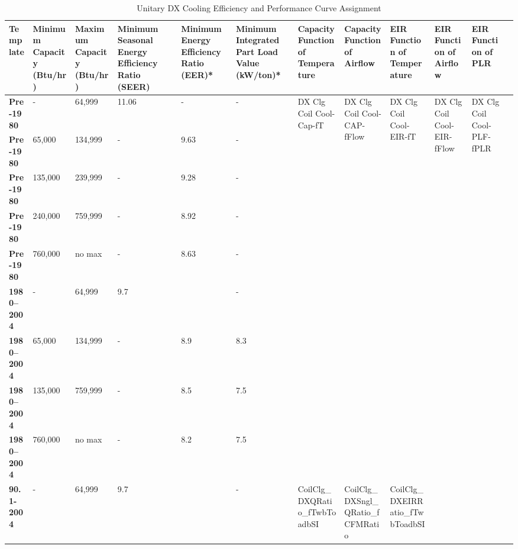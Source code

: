 \begin{table}
\scriptsize
\centering
\caption{Unitary DX Cooling Efficiency and Performance Curve Assignment}
\label{tab:unitary_dx_efficiencies}
\begin{tabular}{|p{0.4in}|p{0.4in}|p{0.4in}|p{0.4in}|p{0.4in}|p{0.4in}|p{0.4in}|p{0.4in}|p{0.4in}|p{0.4in}|p{0.4in}|p{0.4in}|}
\hline
\textbf{Template} &
  \textbf{Minimum Capacity   (Btu/hr)} &
  \textbf{Maximum Capacity   (Btu/hr)} &
  \textbf{Minimum Seasonal   Energy Efficiency Ratio (SEER)} &
  \textbf{Minimum Energy   Efficiency Ratio (EER)*} &
  \textbf{Minimum   Integrated Part Load Value (kW/ton)*} &
  \textbf{Capacity Function of Temperature} &
  \textbf{Capacity Function of Airflow} &
  \textbf{EIR Function of Temperature} &
  \textbf{EIR Function of Airflow} &
  \textbf{EIR Function of PLR} \\ \hline
\textbf{Pre-1980} &   - & 64,999 & 11.06 & - & - &
  \multirow{9}{*}{\parbox{0.4in}{DX Clg Coil Cool-Cap-fT}} &
  \multirow{9}{*}{\parbox{0.4in}{DX Clg Coil Cool-CAP-fFlow}} &
  \multirow{9}{*}{\parbox{0.4in}{DX Clg Coil Cool-EIR-fT}} &
  \multirow{9}{*}{\parbox{0.4in}{DX Clg Coil Cool-EIR-fFlow}} &
  \multirow{9}{*}{\parbox{0.4in}{DX Clg Coil Cool-PLF-fPLR}} \\ \cline{1-6}
\textbf{Pre-1980}  & 65,000  & 134,999   & -   & 9.63 & -   &  &  &  &  &  \\ \cline{1-6}
\textbf{Pre-1980}  & 135,000 & 239,999   & -   & 9.28 & -   &  &  &  &  &  \\ \cline{1-6}
\textbf{Pre-1980}  & 240,000 & 759,999   & -   & 8.92 & -   &  &  &  &  &  \\ \cline{1-6}
\textbf{Pre-1980}  & 760,000 & no max    & -   & 8.63 & -   &  &  &  &  &  \\ \cline{1-6}
\textbf{1980--2004} & -       & 64,999    & 9.7 &      & -   &  &  &  &  &  \\ \cline{1-6}
\textbf{1980--2004} & 65,000  & 134,999   & -   & 8.9  & 8.3 &  &  &  &  &  \\ \cline{1-6}
\textbf{1980--2004} & 135,000 & 759,999   & -   & 8.5  & 7.5 &  &  &  &  &  \\ \cline{1-6}
\textbf{1980--2004} & 760,000 & no max    & -   & 8.2  & 7.5 &  &  &  &  &  \\ \hline
\textbf{90.1-2004} & -       & 64,999    & 9.7 &      &   - &
  \multirow{10}{*}{\parbox{0.4in}{CoilClg\_DXQRatio\_fTwbToadbSI}} &
  \multirow{10}{*}{\parbox{0.4in}{CoilClg\_DXSngl\_QRatio\_fCFMRatio}} &
  \multirow{10}{*}{\parbox{0.4in}{CoilClg\_DXEIRRatio\_fTwbToadbSI}} &

\end{tabular}
\end{table}
